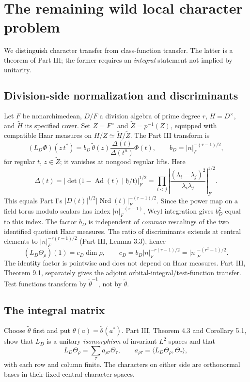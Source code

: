 \documentclass[11pt]{article}
\newcommand{\Nrd}{\operatorname{Nrd}}
\newcommand{\tH}{\widetilde H}
\newcommand{\tZ}{\widetilde Z}
\theoremstyle{plain}
\theoremstyle{definition}
\begin{document}
\section{The remaining wild local character problem}\label{sec:wild}
We distinguish character transfer from class-function transfer.
The latter is a theorem of Part III; the former requires an
\emph{integral} statement not implied by unitarity.

\subsection{Division-side normalization and discriminants}
Let $F$ be nonarchimedean, $D/F$ a division algebra of prime
degree $r$, $H=D^\times$, and $\tH$ its specified cover.
Set $Z=F^\times$ and $\tZ=p^{-1}(Z)$, equipped with compatible
Haar measures on $H/Z\simeq\tH/\tZ$.  The Part III transform is
\begin{equation}\label{eq:LD}
 (L_D\Phi)(z\,t^*)
 =b_D\,\widetilde\theta(z)
  \frac{\Delta(t)}{\Delta(t^n)}\Phi(t),\qquad
 b_D=|n|_F^{-(r-1)/2},
\end{equation}
for regular $t$, $z\in\tZ$; it vanishes at nongood regular lifts.
Here
\begin{equation}\label{eq:Delta}
 \Delta(t)=\left|\det\bigl(1-\operatorname{Ad}(t)
 \mid\mathfrak h/\mathfrak t\bigr)\right|_F^{1/2}
 =\prod_{i<j}\left|
 \frac{(\lambda_i-\lambda_j)^2}{\lambda_i\lambda_j}
 \right|_F^{1/2}.
\end{equation}
This equals Part I's $|D(t)|^{1/2}|\Nrd(t)|_F^{-(r-1)/2}$.
Since the power map on a field torus modulo scalars has index
$|n|_F^{-(r-1)}$, Weyl integration gives $b_D^2$
equal to this index.  The factor $b_D$ is independent of
\emph{common} rescalings of the two identified quotient Haar
measures.  The ratio of discriminants extends at central elements
to $|n|_F^{-r(r-1)/2}$ (Part III, Lemma 3.3), hence
\begin{equation}\label{eq:cD}
 (L_D\Theta_\rho)(1)=c_D\dim\rho,\qquad
 c_D=b_D|n|_F^{-r(r-1)/2}
 =|n|_F^{-(r^2-1)/2}.
\end{equation}
The identity factor is pointwise and does not depend on Haar
measures.  Part III, Theorem 9.1, separately gives the adjoint
orbital-integral/test-function transfer.  Test functions transform
by $\widetilde\theta^{-1}$, not by $\widetilde\theta$.

\subsection{The integral matrix}\label{subsec:integral}
Choose $\widetilde\theta$ first and put
$\theta(a)=\widetilde\theta(a^*)$.
Part III, Theorem 4.3 and Corollary 5.1, show that $L_D$ is a
unitary \emph{isomorphism} of invariant $L^2$ spaces and that
\begin{equation}\label{eq:matrixchars}
 L_D\Theta_\rho=\sum_\tau a_{\rho\tau}\Theta_\tau,
 \qquad a_{\rho\tau}=\langle L_D\Theta_\rho,
 \Theta_\tau\rangle,
\end{equation}
with each row and column finite.  The characters on either side
are orthonormal bases in their fixed-central-character spaces.
\end{document}
